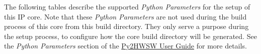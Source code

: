 
The following tables describe the supported \textit{Python Parameters} for the setup of this IP core.
Note that these \textit{Python Parameters} are not used during the build process of this core from this build directory.
They only serve a purpose during the setup process, to configure how the core build directory will be generated.
See the \textit{Python Parameters} section of the \href{https://github.com/IObundle/py2hwsw/blob/main/py2hwsw/py2hwsw_document/document/ug.pdf}{Py2HWSW User Guide} for more details.
\clearpage